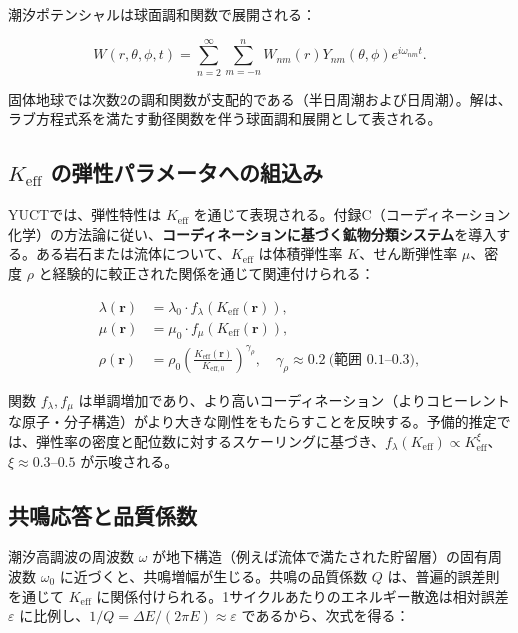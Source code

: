 \documentclass[12pt,a4paper]{article}
\theoremstyle{remark}
\newcommand{\Keff}{K_{\mathrm{eff}}}
\newcommand{\Keffzero}{K_{\mathrm{eff},0}}
\newcommand{\eps}{\varepsilon}
\begin{document}
	潮汐ポテンシャルは球面調和関数で展開される：
	
	\begin{equation}
		W(r,\theta,\phi,t) = \sum_{n=2}^{\infty} \sum_{m=-n}^{n} W_{nm}(r) Y_{nm}(\theta,\phi) e^{i\omega_{nm}t}.
		\label{eq:tidal-potential}
	\end{equation}
	
	固体地球では次数2の調和関数が支配的である（半日周潮および日周潮）。解は、ラブ方程式系を満たす動径関数を伴う球面調和展開として表される。
	
	\subsection{\(\Keff\) の弾性パラメータへの組込み}
	
	YUCTでは、弾性特性は \(\Keff\) を通じて表現される。付録C（コーディネーション化学）の方法論に従い、\textbf{コーディネーションに基づく鉱物分類システム}を導入する。ある岩石または流体について、\(\Keff\) は体積弾性率 \(K\)、せん断弾性率 \(\mu\)、密度 \(\rho\) と経験的に較正された関係を通じて関連付けられる：
	
	\begin{align}
		\lambda(\mathbf{r}) &= \lambda_0 \cdot f_\lambda(\Keff(\mathbf{r})), \\
		\mu(\mathbf{r}) &= \mu_0 \cdot f_\mu(\Keff(\mathbf{r})), \\
		\rho(\mathbf{r}) &= \rho_0 \left(\frac{\Keff(\mathbf{r})}{\Keffzero}\right)^{\gamma_\rho}, \quad \gamma_\rho \approx 0.2\ \text{(範囲 0.1–0.3)},
		\label{eq:keff-properties}
	\end{align}
	
	関数 \(f_\lambda, f_\mu\) は単調増加であり、より高いコーディネーション（よりコヒーレントな原子・分子構造）がより大きな剛性をもたらすことを反映する。予備的推定では、弾性率の密度と配位数に対するスケーリングに基づき、\(f_\lambda(\Keff) \propto \Keff^{\xi}\)、\(\xi \approx 0.3\)–\(0.5\) が示唆される。
	
	\subsection{共鳴応答と品質係数}
	
	潮汐高調波の周波数 \(\omega\) が地下構造（例えば流体で満たされた貯留層）の固有周波数 \(\omega_0\) に近づくと、共鳴増幅が生じる。共鳴の品質係数 \(Q\) は、普遍的誤差則を通じて \(\Keff\) に関係付けられる。1サイクルあたりのエネルギー散逸は相対誤差 \(\eps\) に比例し、\(1/Q = \Delta E / (2\pi E) \approx \eps\) であるから、次式を得る：
	
\end{document}
